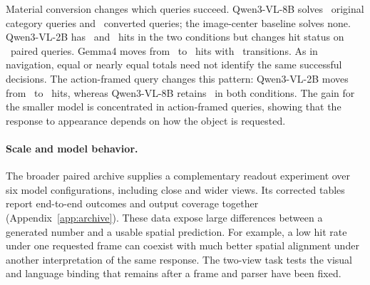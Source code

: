 Material conversion changes which queries succeed. Qwen3-VL-8B
solves \LargeFullOrig\ original category queries and \LargeFullConv\ converted queries; the image-center
baseline solves none. Qwen3-VL-2B has \SmallFullOrig\ and \SmallFullConv\ hits in the two conditions but changes hit
status on \SmallFullFlips\ paired queries. Gemma4 moves from \GemmaFullOrig\ to \GemmaFullConv\ hits with \GemmaFullFlips\
transitions. As in navigation, equal or nearly equal totals need not identify
the same successful decisions. The action-framed query changes this pattern:
Qwen3-VL-2B moves from \SmallActionOrig\ to \SmallActionConv\ hits, whereas Qwen3-VL-8B retains \LargeActionOrig\
in both conditions. The gain for the smaller model is concentrated in action-framed queries,
showing that the response to appearance depends on how the object is requested.

\paragraph{Scale and model behavior.}
The broader paired archive supplies a complementary readout experiment over six
model configurations, including close and wider views. Its corrected tables
report end-to-end outcomes and output coverage together
(Appendix~\ref{app:archive}). These data expose large differences between a
generated number and a usable spatial prediction. For example, a low hit rate
under one requested frame can coexist with much better spatial alignment under
another interpretation of the same response. The two-view task tests the visual
and language binding that remains after a frame and parser have been fixed.
